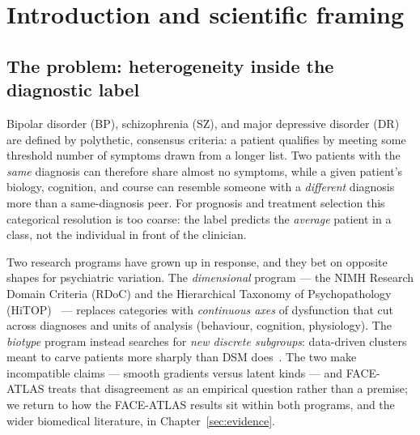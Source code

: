 \section{Introduction and scientific framing}
\label{sec:intro}

\subsection{The problem: heterogeneity inside the diagnostic label}
Bipolar disorder (BP), schizophrenia (SZ), and major depressive disorder (DR) are defined by polythetic,
consensus criteria: a patient qualifies by meeting some threshold number of symptoms drawn from a longer
list. Two patients with the \emph{same} diagnosis can therefore share almost no symptoms, while a given
patient's biology, cognition, and course can resemble someone with a \emph{different} diagnosis more than a
same-diagnosis peer. For prognosis and treatment selection this categorical resolution is too coarse: the
label predicts the \emph{average} patient in a class, not the individual in front of the clinician.

Two research programs have grown up in response, and they bet on opposite shapes for psychiatric variation.
The \emph{dimensional} program --- the NIMH Research Domain Criteria (RDoC) and the Hierarchical Taxonomy of
Psychopathology (HiTOP)~\cite{insel2010rdoc,kotov2017hitop} --- replaces categories with \emph{continuous
axes} of dysfunction that cut across diagnoses and units of analysis (behaviour, cognition, physiology). The
\emph{biotype} program instead searches for \emph{new discrete subgroups}: data-driven clusters meant to
carve patients more sharply than DSM does~\cite{clementz2016biotypes}.
The two make incompatible claims --- smooth gradients versus latent kinds --- and FACE-ATLAS treats that
disagreement as an empirical question rather than a premise; we return to how the FACE-ATLAS results sit within
both programs, and the wider biomedical literature, in Chapter~\ref{sec:evidence}.

